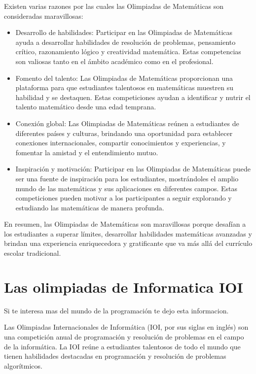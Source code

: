 \documentclass[11pt]{scrartcl}
\begin{document}
Existen varias razones por las cuales las Olimpiadas de Matemáticas son consideradas maravillosas:
\begin{itemize}
	\item Desarrollo de habilidades: Participar en las Olimpiadas de Matemáticas ayuda a desarrollar habilidades de resolución de problemas, pensamiento crítico, razonamiento lógico y creatividad matemática. Estas competencias son valiosas tanto en el ámbito académico como en el profesional.


	\item Fomento del talento: Las Olimpiadas de Matemáticas proporcionan una plataforma para que estudiantes talentosos en matemáticas muestren su habilidad y se destaquen. Estas competiciones ayudan a identificar y nutrir el talento matemático desde una edad temprana.


	\item Conexión global: Las Olimpiadas de Matemáticas reúnen a estudiantes de diferentes países y culturas, brindando una oportunidad para establecer conexiones internacionales, compartir conocimientos y experiencias, y fomentar la amistad y el entendimiento mutuo.

	\item Inspiración y motivación: Participar en las Olimpiadas de Matemáticas puede ser una fuente de inspiración para los estudiantes, mostrándoles el amplio mundo de las matemáticas y sus aplicaciones en diferentes campos. Estas competiciones pueden motivar a los participantes a seguir explorando y estudiando las matemáticas de manera profunda.
\end{itemize}
En resumen, las Olimpiadas de Matemáticas son maravillosas porque desafían a los estudiantes a superar límites, desarrollar habilidades matemáticas avanzadas y brindan una experiencia enriquecedora y gratificante que va más allá del currículo escolar tradicional.

\section{Las olimpiadas de Informatica IOI}
Si te interesa mas del mundo de la programaci\'on te dejo esta informacion.\cite{ioinformatics}

Las Olimpiadas Internacionales de Informática (IOI, por sus siglas en inglés) son una competición anual de programación y resolución de problemas en el campo de la informática. La IOI reúne a estudiantes talentosos de todo el mundo que tienen habilidades destacadas en programación y resolución de problemas algorítmicos.
\end{document}
